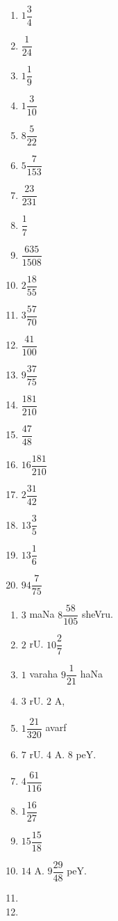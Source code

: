 
\begin{multicols}{5}
\begin{enumerate}[$(1)$]
\item $1\dfrac{3}{4}$ 
\item $\dfrac{1}{24}$
\item $1\dfrac{1}{9}$ 
\item $1\dfrac{3}{10}$
\item $8\dfrac{5}{22}$ 
\item $5\dfrac{7}{153}$
\item $\dfrac{23}{231}$
\item $\dfrac{1}{7}$
\item $\dfrac{635}{1508}$ 
\item $2\dfrac{18}{55}$
\item $3\dfrac{57}{70}$ 
\item $\dfrac{41}{100}$
\item $9\dfrac{37}{75}$
\item $\dfrac{181}{210}$
\item $\dfrac{47}{48}$
\item $16\dfrac{181}{210}$
\item $2\dfrac{31}{42}$ 
\item $13\dfrac{3}{5}$
\item $13\dfrac{1}{6}$
\item $94\dfrac{7}{75}$
\end{enumerate}
\end{multicols}

\smallskip
{}

\begin{multicols}{3}
\begin{enumerate}[$(1)$]
\item $3$ maNa $8 \dfrac{58}{105}$ sheVru. 
\item $2$ rU. $10 \dfrac{2}{7}$
\item $1$ varaha $9 \dfrac{1}{21}$ haNa 
\item $3$ rU. $2$ A,
\item $1 \dfrac{21}{320}$ avarf 
\item $7$ rU. $4$ A. $8$ peY.
\item $4 \dfrac{61}{116}$ 
\item $1\dfrac{16}{27}$
\item $15 \dfrac{15}{18}$
\item $14$ A. $9 \dfrac{29}{48}$ peY.
\item[]
\item[]
\end{enumerate}
\end{multicols}

